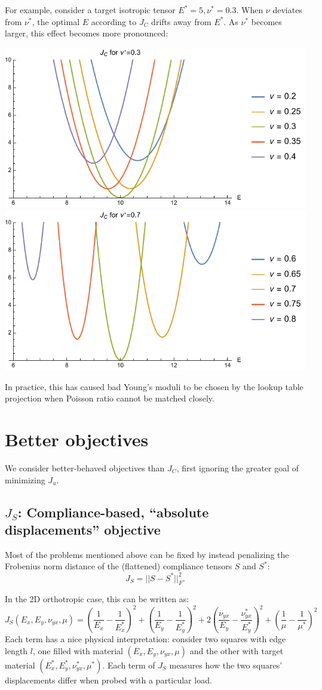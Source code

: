 \documentclass[10pt]{article}
\begin{document}
For example, consider a target isotropic tensor $E^* = 5, \nu^* = 0.3$. When
$\nu$ deviates from $\nu^*$, the optimal $E$ according to $J_C$ drifts away from
$E^*$. As $\nu^*$ becomes larger, this effect becomes more pronounced:
\\
\begin{minipage}{\linewidth}
    \centering
    \includegraphics[width=.45\textwidth]{interplayE.pdf}
    \includegraphics[width=.45\textwidth]{interplayELargeNu.pdf}
\end{minipage}
In practice, this has caused bad Young's moduli to be chosen by the lookup
table projection when Poisson ratio cannot be matched closely.

\section{Better objectives}
We consider better-behaved objectives than $J_C$, first ignoring the greater goal of minimizing $J_u$.

\subsection{$J_S$: Compliance-based, ``absolute displacements'' objective}
Most of the problems mentioned above can be fixed by instead penalizing the
Frobenius norm distance of the (flattened) compliance tensors $S$ and $S^*$:
$$
    J_S = ||S - S^*||^2_F.
$$

In the 2D orthotropic case, this can be written as:
\begin{equation}
    \label{eqn:JS}
J_S(E_x, E_y, \nu_{yx}, \mu) = 
\left(\frac{1}{E_x} - \frac{1}{E_x^*}\right)^2 +
\left(\frac{1}{E_y} - \frac{1}{E_y^*}\right)^2 +
2 \left(\frac{\nu_{yx}}{E_y} - \frac{\nu_{yx}^*}{E_y^*}\right)^2 +
\left(\frac{1}{\mu} - \frac{1}{\mu^*}\right)^2
\end{equation}
Each term has a nice physical interpretation: consider two squares with edge
length $l$, one filled with material $(E_x, E_y, \nu_{yx}, \mu)$ and the other
with target material $(E_x^*, E_y^*, \nu_{yx}^*, \mu^*)$. Each term of $J_S$
measures how the two squares' displacements differ when probed with a particular
load.
\end{document}
